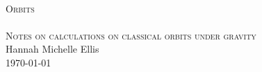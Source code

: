 \begin{titlepage}
\begin{center}
\HRule \\[0.5cm]
\textsc{\huge Orbits}\\[0.5cm]
\HRule \\[0.5cm]
\textsc{\Large Notes on calculations on classical orbits under gravity}\\[0.5cm]
\vfill
Hannah Michelle Ellis\\[1.0cm]
\today
\end{center}
\end{titlepage}

